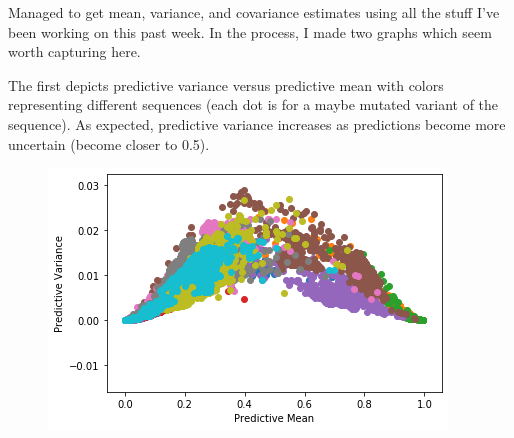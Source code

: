 \begin{Minutes}{}
\maketitle
{}
Managed to get mean, variance, and covariance estimates using all the stuff I've been working on this past week. In the process, I made two graphs which seem worth capturing here.

The first depicts predictive variance versus predictive mean with colors representing different sequences (each dot is for a maybe mutated variant of the sequence). As expected, predictive variance increases as predictions become more uncertain (become closer to 0.5).
\begin{figure}[h]
    \includegraphics[width=0.8\linewidth]{figures/predictive_variance_vs_predictive_mean}
\end{figure}
\end{Minutes}
